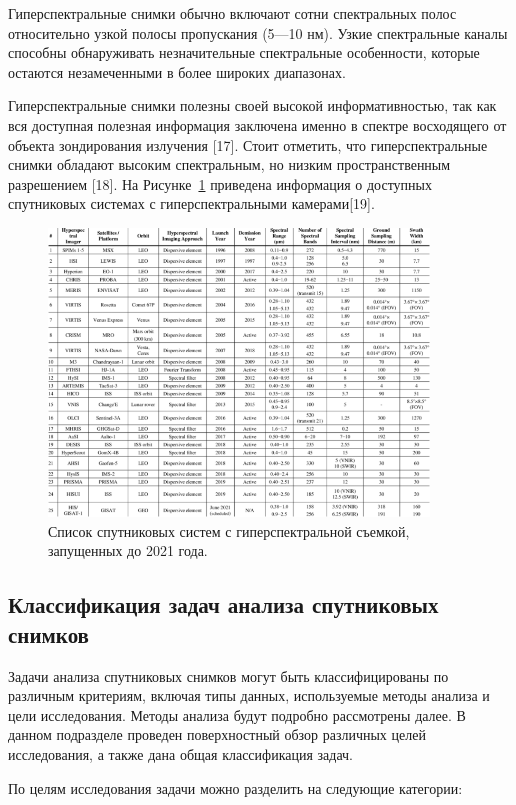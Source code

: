\documentclass[14pt, russian]{scrartcl}
\begin{document}
Гиперспектральные снимки обычно включают сотни спектральных полос относительно узкой полосы пропускания (5—10 нм). Узкие спектральные каналы способны обнаруживать незначительные спектральные особенности, которые остаются незамеченными в более широких диапазонах.

Гиперспектральные снимки полезны своей высокой информативностью, так как вся доступная полезная информация заключена именно в спектре восходящего от объекта зондирования излучения [17]. Стоит отметить, что гиперспектральные снимки обладают высоким спектральным, но низким пространственным разрешением [18]. На Рисунке~\ref{fig::figure1} приведена информация о доступных спутниковых системах с гиперспектральными камерами[19].

\begin{figure}[!htb]\centering
\includegraphics[width=0.9\textwidth]{img1.png}
\caption{Список спутниковых систем с гиперспектральной съемкой, запущенных до 2021 года.}
\label{fig::figure1}
\end{figure}

\subsection{Классификация задач анализа спутниковых снимков}

Задачи анализа спутниковых снимков могут быть классифицированы по различным критериям, включая типы данных, используемые методы анализа и цели исследования. Методы анализа будут подробно рассмотрены далее. В данном подразделе проведен поверхностный обзор различных целей исследования, а также дана общая классификация задач.

По целям исследования задачи можно разделить на следующие категории:
\end{document}

